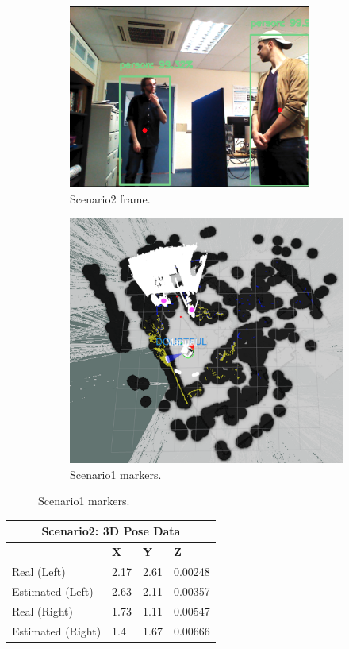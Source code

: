 \begin{figure}[H]
    \begin{subfigure}{.5\textwidth}
        \centering
        \includegraphics[width=8cm]{images/chapter6_scenario2.png}
        \caption{Scenario2 frame.}
	\end{subfigure}
    \begin{subfigure}{.5\textwidth}
        \centering
        \includegraphics[width=.9\linewidth]{images/chapter6_rviz_extend2.png}
        \caption{Scenario1 markers.}
        \label{2b}
	\end{subfigure}
\end{figure}

\begin{table}[H]
  \centering
  \begin{tabular}{ |p{4cm}|p{2cm}|p{2cm}|p{2cm}|  }
    \hline
    \multicolumn{4}{|c|}{Scenario2: 3D Pose Data} \\
    \hline
    & \textbf{X} & \textbf{Y} & \textbf{Z} \\
    \hline
    Real (Left) & 2.17 & 2.61 & 0.00248 \\
    Estimated (Left) & 2.63 & 2.11 & 0.00357 \\
    \hline
    Real (Right) & 1.73 & 1.11 & 0.00547 \\
    Estimated (Right) & 1.4 & 1.67 & 0.00666 \\
    \hline
  \end{tabular}
\end{table}

